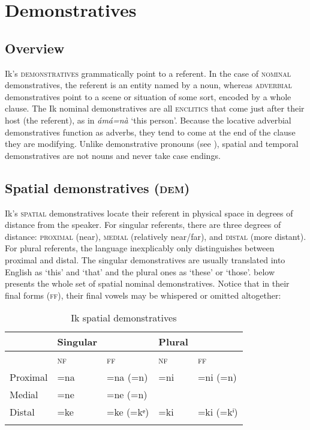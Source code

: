 \section{Demonstratives}\label{sec:6}



\subsection{Overview}\label{sec:6.1}


Ik’s \textsc{demonstratives} grammatically point to a referent. In the case of \textsc{nominal} demonstratives, the referent is an entity named by a noun, whereas \textsc{adverbial} demonstratives point to a scene or situation of some sort, encoded by a whole clause. The Ik nominal demonstratives are all \textsc{enclitics} that come just after their host (the referent), as in \textit{ámá=nà} ‘this person’. Because the locative adverbial demonstratives function as adverbs, they tend to come at the end of the clause they are modifying. Unlike demonstrative pronouns (see ), spatial and temporal demonstratives are not nouns and never take case endings.




\subsection{Spatial demonstratives (\textsc{dem})}\label{sec:6.2}


Ik’s \textsc{spatial} demonstratives locate their referent in physical space in degrees of distance from the speaker. For singular referents, there are three degrees of distance: \textsc{proximal} (near), \textsc{medial} (relatively near/far), and \textsc{distal} (more distant). For plural referents, the language inexplicably only distinguishes between proximal and distal. The singular demonstratives are usually translated into English as ‘this’ and ‘that’ and the plural ones as ‘these’ or ‘those’.  below presents the whole set of spatial nominal demonstratives. Notice that in their final forms (\textsc{ff}), their final vowels may be whispered or omitted altogether:


\begin{table}
\caption{Ik spatial demonstratives}
\label{tab:dem:spat}
\begin{tabularx}{\textwidth}{XXXXX}
\lsptoprule
& Singular &  & Plural & \\
\midrule
& \textsc{nf} & \textsc{ff} & \textsc{nf} & \textsc{ff}\\
Proximal & =na & =na (=n) & =ni & =ni (=n)\\
Medial & =ne & =ne (=n) &  & \\
Distal & =ke & =ke (=kᵉ) & =ki & =ki (=kⁱ)\\
\lspbottomrule
\end{tabularx}
\end{table}

